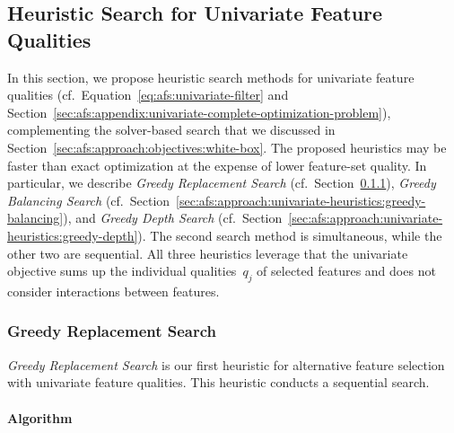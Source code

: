 \documentclass{article}
\theoremstyle{definition}
\begin{document}
\subsection{Heuristic Search for Univariate Feature Qualities}
\label{sec:afs:approach:univariate-heuristics}

In this section, we propose heuristic search methods for univariate feature qualities (cf.~Equation~\ref{eq:afs:univariate-filter} and Section~\ref{sec:afs:appendix:univariate-complete-optimization-problem}), complementing the solver-based search that we discussed in Section~\ref{sec:afs:approach:objectives:white-box}.
The proposed heuristics may be faster than exact optimization at the expense of lower feature-set quality.
In particular, we describe \emph{Greedy Replacement Search} (cf.~Section~\ref{sec:afs:approach:univariate-heuristics:greedy-replacement}), \emph{Greedy Balancing Search} (cf.~Section~\ref{sec:afs:approach:univariate-heuristics:greedy-balancing}), and \emph{Greedy Depth Search} (cf.~Section~\ref{sec:afs:approach:univariate-heuristics:greedy-depth}).
The second search method is simultaneous, while the other two are sequential.
All three heuristics leverage that the univariate objective sums up the individual qualities~$q_j$ of selected features and does not consider interactions between features.

\subsubsection{Greedy Replacement Search}
\label{sec:afs:approach:univariate-heuristics:greedy-replacement}

\emph{Greedy Replacement Search} is our first heuristic for alternative feature selection with univariate feature qualities.
This heuristic conducts a sequential search.

\paragraph{Algorithm}
\end{document}
